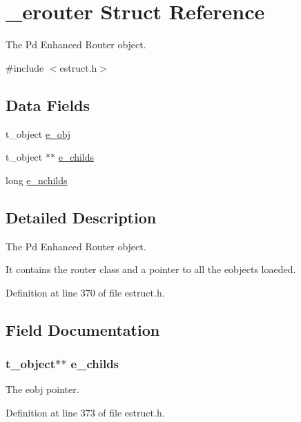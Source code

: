 \hypertarget{struct__erouter}{\section{\-\_\-erouter Struct Reference}
\label{struct__erouter}
}


The Pd Enhanced Router object.  




{\ttfamily \#include $<$estruct.\-h$>$}

\subsection*{Data Fields}
\begin{DoxyCompactItemize}
\item 
t\-\_\-object \hyperlink{struct__erouter_a337dd8dd1771ebe57e90886d4fdfe92d}{e\-\_\-obj}
\item 
t\-\_\-object $\ast$$\ast$ \hyperlink{struct__erouter_a5484fdcb775740c1c4dedcd94b4580ab}{e\-\_\-childs}
\item 
long \hyperlink{struct__erouter_aae6cef9e2d4de46e690ad868953d0923}{e\-\_\-nchilds}
\end{DoxyCompactItemize}


\subsection{Detailed Description}
The Pd Enhanced Router object. 

It contains the router class and a pointer to all the eobjects loaeded. 

Definition at line 370 of file estruct.\-h.



\subsection{Field Documentation}
\hypertarget{struct__erouter_a5484fdcb775740c1c4dedcd94b4580ab}{
\subsubsection[{e\-\_\-childs}]{\setlength{\rightskip}{0pt plus 5cm}t\-\_\-object$\ast$$\ast$ e\-\_\-childs}}\label{struct__erouter_a5484fdcb775740c1c4dedcd94b4580ab}
The eobj pointer. 

Definition at line 373 of file estruct.\-h.


